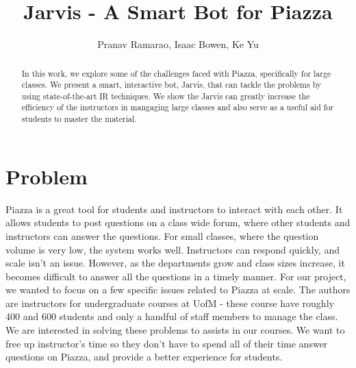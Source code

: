 \documentclass[sigconf]{acmart}
\begin{document}
\title{Jarvis - A Smart Bot for Piazza}
\author{Pranav Ramarao, Isaac Bowen, Ke Yu}


\renewcommand{\shortauthors}{Ramarao, Bowen, Yu}


\begin{abstract}
In this work, we explore some of the challenges faced with Piazza, specifically for large classes. We present a smart, interactive bot, Jarvis, that can tackle the problems by using state-of-the-art IR techniques. We show the Jarvis can greatly increase the efficiency of the instructors in mangaging large classes and also serve as a useful aid for students to master the material.
\end{abstract}


\maketitle

\section{Problem}
Piazza is a great tool for students and instructors to interact with each other. It allows students to post questions on a class wide forum, where other students and instructors can answer the questions. For small classes, where the question volume is very low, the system works well. Instructors can respond quickly, and scale isn't an issue. However, as the departments grow and class sizes increase, it becomes difficult to answer all the questions in a timely manner. For our project, we wanted to focus on a few specific issues related to Piazza at scale. The authors are instructors for undergraduate courses at UofM - these course have roughly 400 and 600 students and only a handful of staff members to manage the class. We are interested in solving these problems to assists in our courses. We want to free up instructor's time so they don't have to spend all of their time answer questions on Piazza, and provide a better experience for students.
\end{document}
